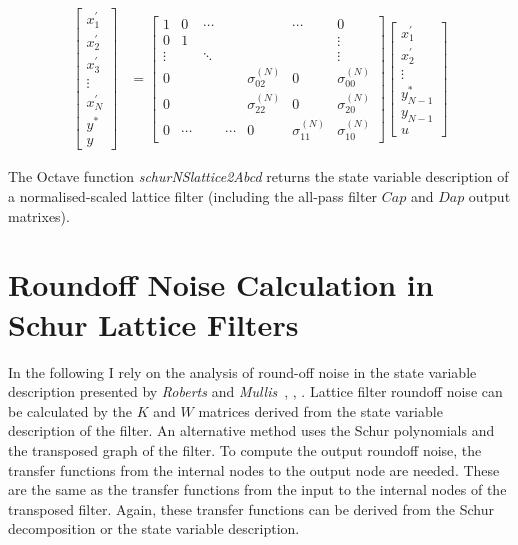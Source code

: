 \documentclass[a4paper,twoside,10pt,english]{report}
\begin{document}
\begin{align*}
\left[\begin{array}{c}
x_{1}^{\prime}\\
x_{2}^{\prime}\\
x_{3}^{\prime}\\
\vdots\\
x_{N}^{\prime}\\
y^{*}\\
y
\end{array}\right] & =  \left[\begin{array}{ccccccc}
1 & 0 & \cdots &  &  & \cdots & 0\\
0 & 1 &  &  &  &  & \vdots\\
\vdots &  &  \ddots&  &  &  & \vdots\\
0 &  &  &  & \sigma_{02}^{\left(N\right)} & 0 & \sigma_{00}^{\left(N\right)}\\
0 &  &  &  & \sigma_{22}^{\left(N\right)} & 0 & \sigma_{20}^{\left(N\right)}\\
0 & \cdots &  & \cdots & 0 & \sigma_{11}^{\left(N\right)} & \sigma_{10}^{\left(N\right)}
\end{array}\right]\left[\begin{array}{c}
x_{1}^{\prime}\\
x_{2}^{\prime}\\
\vdots\\
y_{N-1}^{*}\\
y_{N-1}\\
u
\end{array}\right]
\end{align*}


The Octave function \emph{schurNSlattice2Abcd} returns the state variable
description of a normalised-scaled lattice filter (including the all-pass
filter $Cap$ and $Dap$ output matrixes).

\section{Roundoff Noise Calculation in Schur Lattice Filters}
In the following I rely on the analysis of round-off noise in the
state variable description presented by \emph{Roberts} and
\emph{Mullis}~\cite{RobertsMullis_DigitalSignalProcessing}, 
\cite{MullisRoberts_RoundoffNoiseInDigitalFiltersFrequencyTransformations}, 
\cite{MullisRoberts_SynthesisMinimumRoundoffNoiseDigitalFilters}.
Lattice filter roundoff noise can be calculated by the $K$ and $W$
matrices derived from the state variable description of the filter.
An alternative method uses the Schur polynomials and the transposed
graph of the filter. To compute the output roundoff noise, the transfer
functions from the internal nodes to the output node are needed. These
are the same as the transfer functions from the input to the internal
nodes of the transposed filter. Again, these transfer functions can
be derived from the Schur decomposition or the state variable description.
\end{document}
